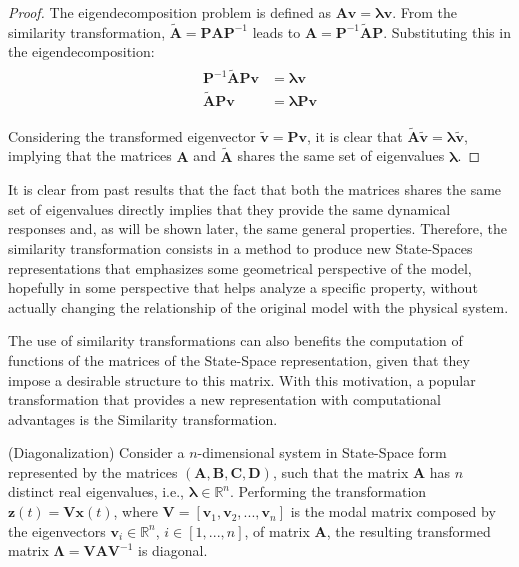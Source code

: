\documentclass[a4paper,11pt]{book}
\numberwithin{figure}{chapter}
\numberwithin{equation}{chapter}
\numberwithin{table}{chapter}
\newtheorem{theorem}{Theorem}[chapter]
\theoremstyle{definition}
\newcounter{boxed-theorem}
\newenvironment{boxed-theorem}[1]
{\begin{shaded} \begin{theorem}{#1}}
{\end{theorem} \end{shaded}}
\newcounter{boxed-definition}
\begin{document}
\begin{proof}
    The eigendecomposition problem is defined as $\bm{A} \bm{v} = \bm{\lambda} \bm{v}$. From the similarity transformation, $\tilde{\bm{A}} = \bm{P} \bm{A} \bm{P}^{-1}$ leads to $\bm{A} = \bm{P}^{-1} \tilde{\bm{A}} \bm{P}$. Substituting this in the eigendecomposition:
    \begin{align}
    \begin{split}
        \bm{P}^{-1} \tilde{\bm{A}} \bm{P} \bm{v} & = \bm{\lambda} \bm{v} \\
        \tilde{\bm{A}} \bm{P} \bm{v} & =  \bm{\lambda} \bm{P} \bm{v}
    \end{split}
    \end{align}
   
    Considering the transformed eigenvector $\tilde{\bm{v}} = \bm{P} \bm{v}$, it is clear that $\tilde{\bm{A}} \tilde{\bm{v}} = \bm{\lambda} \tilde{\bm{v}}$, implying that the matrices $\bm{A}$ and $\tilde{\bm{A}}$ shares the same set of eigenvalues $\bm{\lambda}$.
\end{proof}

It is clear from past results that the fact that both the matrices shares the same set of eigenvalues directly implies that they provide the same dynamical responses and, as will be shown later, the same general properties. Therefore, the similarity transformation consists in a method to produce new State-Spaces representations that emphasizes some geometrical perspective of the model, hopefully in some perspective that helps analyze a specific property, without actually changing the relationship of the original model with the physical system.

The use of similarity transformations can also benefits the computation of functions of the matrices of the State-Space representation, given that they impose a desirable structure to this matrix. With this motivation, a popular transformation that provides a new representation with computational advantages is the Similarity transformation.

\begin{boxed-theorem}{(Diagonalization)}
	Consider a $n$-dimensional system in State-Space form represented by the matrices $(\bm{A}, \bm{B}, \bm{C}, \bm{D})$, such that the matrix $\bm{A}$ has $n$ distinct real eigenvalues, i.e., $\bm{\lambda} \in \mathbb{R}^n$. Performing the transformation $\bm{z}(t) = \bm{V} \bm{x}(t)$, where $\bm{V} = [\bm{v}_1, \bm{v}_2, ..., \bm{v}_n]$ is the modal matrix composed by the eigenvectors $\bm{v}_i \in \mathbb{R}^n$, $i \in [1, ..., n]$, of matrix $\bm{A}$, the resulting transformed matrix $\bm{\Lambda} = \bm{V} \bm{A} \bm{V}^{-1}$ is diagonal.
\end{boxed-theorem} 
\end{document}
